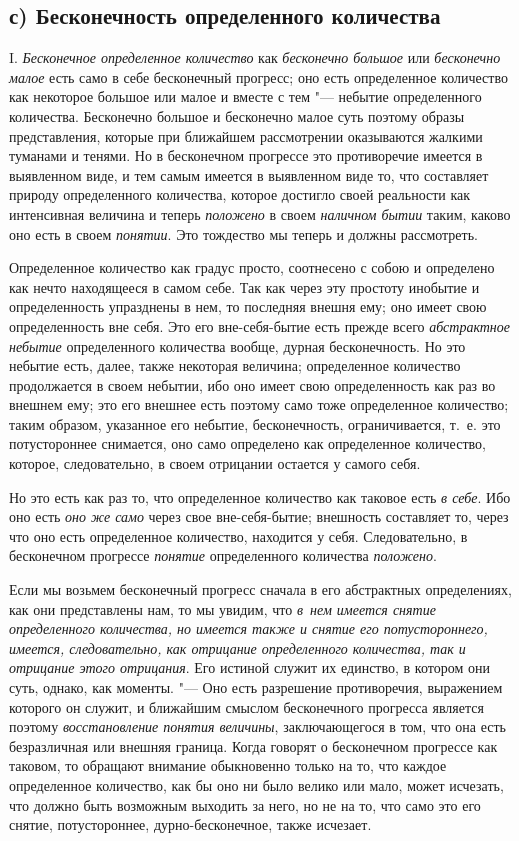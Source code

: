 \subsection[с) Бесконечность определенного количества]%
{с) Бесконечность определенного количества}

I. {\em Бесконечное определенное количество} как {\em бесконечно большое} или
{\em бесконечно малое} есть само в себе бесконечный прогресс; оно есть
определенное количество как некоторое большое или малое и вместе с тем "---
небытие определенного количества. Бесконечно большое и бесконечно малое суть
поэтому образы представления, которые при ближайшем рассмотрении оказываются
жалкими туманами и тенями. Но в бесконечном прогрессе это противоречие имеется
в выявленном виде, и тем самым имеется в выявленном виде то, что составляет
природу определенного количества, которое достигло своей реальности как
интенсивная величина и теперь {\em положено} в своем {\em наличном бытии}
таким, каково оно есть в своем {\em понятии}. Это тождество мы теперь и должны
рассмотреть.

Определенное количество как градус просто, соотнесено с собою и определено как
нечто находящееся в самом себе. Так как через эту простоту инобытие
и определенность упразднены в нем, то последняя внешня ему; оно имеет свою
определенность вне себя. Это его вне-себя-бытие есть прежде всего
{\em абстрактное небытие} определенного количества вообще, дурная
бесконечность. Но это небытие есть, далее, также некоторая величина;
определенное количество продолжается в своем небытии, ибо оно имеет свою
определенность как раз во внешнем ему; это его внешнее есть поэтому само тоже
определенное количество; таким образом, указанное его небытие, бесконечность,
ограничивается, т.~е. это потустороннее снимается, оно само определено как
определенное количество, которое, следовательно, в своем отрицании остается
у самого себя.

Но это есть как раз то, что определенное количество как таковое есть
{\em в себе}. Ибо оно есть {\em оно же само} через свое вне-себя-бытие;
внешность составляет то, через что оно есть определенное количество, находится
у себя. Следовательно, в бесконечном прогрессе {\em понятие} определенного
количества {\em положено}.

Если мы возьмем бесконечный прогресс сначала в его абстрактных определениях,
как они представлены нам, то мы увидим, что {\em в~нем имеется снятие
определенного количества, но имеется также и снятие его потустороннего,
имеется, следовательно, как отрицание определенного количества, так и отрицание
этого отрицания}. Его истиной служит их единство, в котором они суть, однако,
как моменты. "--- Оно есть разрешение противоречия, выражением которого он
служит, и ближайшим смыслом бесконечного прогресса является поэтому
{\em восстановление понятия величины}, заключающегося в том, что она есть
безразличная или внешняя граница. Когда говорят о бесконечном прогрессе как
таковом, то обращают внимание обыкновенно только на то, что каждое определенное
количество, как бы оно ни было велико или мало, может исчезать, что должно быть
возможным выходить за него, но не на то, что само это его снятие,
потустороннее, дурно-бесконечное, также исчезает.

